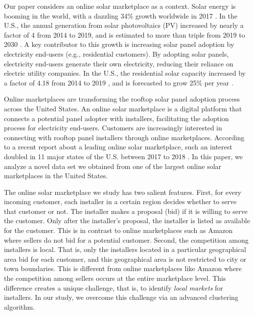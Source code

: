 \documentclass[mnsc,blindrev]{informs3}
\begin{document}
	
	Our paper considers an online solar marketplace as a context. Solar energy is booming in the world, with a dazzling 34\% growth worldwide in 2017 \citep{iea2018snapshot}. In the U.S., the annual generation from solar photovoltaics (PV) increased by nearly a factor of 4 from 2014 to 2019, and is estimated to more than triple from 2019 to 2030 \citep{USEIA-I,USEIA-II}. A key contributor to this growth is increasing solar panel adoption by electricity end-users (e.g., residential customers). By adopting solar panels, electricity end-users generate their own electricity, reducing their reliance on electric utility companies. In the U.S., the residential solar capacity increased by a factor of 4.18 from 2014 to 2019 \citep{USEIA-III}, and is forecasted to grow 25\% per year \citep{weaver_2019,seia,gtmsolar2018}.
	
	Online marketplaces are transforming the rooftop solar panel adoption process across the United States. An online solar marketplace is a digital platform that connects a potential panel adopter with installers, facilitating the adoption process for electricity end-users. Customers are increasingly interested in connecting with rooftop panel installers through online marketplaces. According to a recent report about a leading online solar marketplace, such an interest doubled in 11 major states of the U.S. between 2017 to 2018 \citep{energysageintel19}.  In this paper, we analyze a novel data set we obtained from one of the largest online solar marketplaces in the United States.
	
	
	The online solar marketplace we study has two salient features. First, for every incoming customer, each installer in a certain region decides whether to serve that customer or not. The installer makes a proposal (bid) if it is willing to serve the customer. Only after the installer's proposal, the installer is listed as available for the customer. This is in contrast to online marketplaces such as Amazon where sellers do not bid for a potential customer. Second, the competition among installers is local. That is, only the installers located in a particular geographical area bid for each customer, and this geographical area is not restricted to city or town boundaries. This is different from online marketplaces like Amazon where the competition among sellers occurs at the entire marketplace level. This difference creates a unique challenge, that is, to identify \emph{local markets} for installers. In our study, we overcome this challenge via an advanced clustering algorithm.
	
\end{document}
